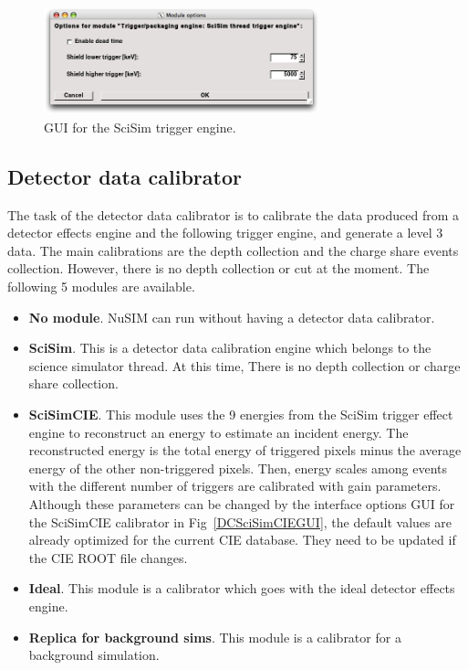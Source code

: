 \begin{figure}[tb]
 \begin{center}
  \includegraphics[width=8cm]{images/TriggerEngineSciSimGUI.png}
  \caption{GUI for the SciSim trigger engine.}
  \label{TESciSimGUI}
 \end{center}
\end{figure}

\subsection{Detector data calibrator}

The task of the detector data calibrator is to calibrate the data
produced from a detector effects engine and the following trigger
engine, and generate a level 3 data.
The main calibrations are the depth collection and the charge share
events collection. However, there is no depth collection or cut at
the moment. The following 5 modules are available.
\begin{itemize}
 \item \textbf{No module}.
       NuSIM can run without having a detector data calibrator.
 \item \textbf{SciSim}.
       This is a detector data calibration engine which belongs to
       the science simulator thread. At this time, There is no
       depth collection or charge share collection.
 \item \textbf{SciSimCIE}.
       This module uses the 9 energies from the SciSim trigger effect
       engine to reconstruct an energy to estimate an incident energy.
       The reconstructed energy is the total energy of triggered pixels
       minus the average energy of the other non-triggered pixels.
       Then, energy scales among events with the different number of
       triggers are calibrated with gain parameters. Although these
       parameters can be changed by the interface options GUI for the
       SciSimCIE calibrator in Fig~\ref{DCSciSimCIEGUI}, the default
       values are already optimized for the current CIE database.
       They need to be updated if the CIE ROOT file changes.
 \item \textbf{Ideal}.
       This module is a calibrator which goes with the ideal
       detector effects engine.
 \item \textbf{Replica for background sims}.
       This module is a calibrator for a background simulation.
\end{itemize}

